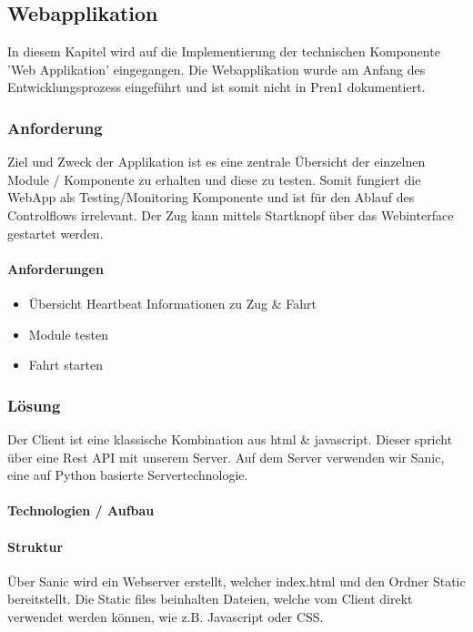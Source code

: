 \documentclass[../../main.tex]{subfiles}
\begin{document}
\subsection{Webapplikation}
In diesem Kapitel wird auf die Implementierung der technischen Komponente 'Web Applikation' eingegangen. Die Webapplikation wurde am Anfang des Entwicklungsprozess eingeführt und ist somit nicht in Pren1 dokumentiert. 
\subsubsection{Anforderung}

Ziel und Zweck der Applikation ist es eine zentrale Übersicht der einzelnen Module / Komponente zu erhalten und diese zu testen. Somit fungiert die WebApp als Testing/Monitoring Komponente und ist für den Ablauf des Controlflows irrelevant. Der Zug kann mittels Startknopf über das Webinterface gestartet werden.

\paragraph{Anforderungen}
\begin{itemize}
    \item Übersicht
      \subitem Heartbeat
      \subitem Informationen zu Zug \& Fahrt
    \item Module testen
    \item Fahrt starten
\end{itemize}

\subsubsection{Lösung}
Der Client ist eine klassische Kombination aus html \& javascript. Dieser spricht über eine Rest API mit unserem Server. Auf dem Server verwenden wir Sanic, eine auf Python basierte Servertechnologie.

\paragraph{Technologien / Aufbau}
 

\paragraph{Struktur}
Über Sanic wird ein Webserver erstellt, welcher index.html und den Ordner Static bereitstellt. Die Static files beinhalten Dateien, welche vom Client direkt verwendet werden können, wie z.B. Javascript oder CSS.
\end{document}
